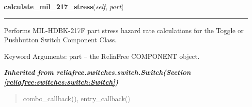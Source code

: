     \label{reliafree:switches:rotary:Rotary:calculate_mil_217_stress}

    \vspace{0.5ex}

\hspace{.8\funcindent}\begin{boxedminipage}{\funcwidth}

    \raggedright \textbf{calculate\_mil\_217\_stress}(\textit{self}, \textit{part})

    \vspace{-1.5ex}

    \rule{\textwidth}{0.5\fboxrule}
\setlength{\parskip}{2ex}
    Performs MIL-HDBK-217F part stress hazard rate calculations for the 
    Toggle or Pushbutton Switch Component Class.

    Keyword Arguments: part -- the ReliaFree COMPONENT object.

\setlength{\parskip}{1ex}
    \end{boxedminipage}


\large{\textbf{\textit{Inherited from reliafree.switches.switch.Switch\textit{(Section \ref{reliafree:switches:switch:Switch})}}}}

\begin{quote}
combo\_callback(), entry\_callback()
\end{quote}

